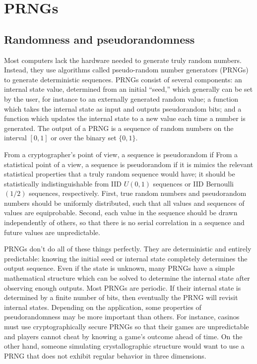 \documentclass[12pt]{article}
\newcommand{\todo}[1]{{\color{red}{TO DO: \sc #1}}}
\begin{document}
\section{PRNGs}
\subsection{Randomness and pseudorandomness}
Most computers lack the hardware needed to generate truly random numbers. 
Instead, they use algorithms called pseudo-random number generators (PRNGs) to generate
deterministic sequences.
PRNGs consist of several components:
an internal state value, determined from an initial ``seed,'' which generally can be set by the user,
for instance to an externally generated random value;
a function which takes the internal state as input and outputs pseudorandom bits;
and a function which updates the internal state to a new value each time a number is generated.
The output of a PRNG is a sequence of random numbers on the interval $[0, 1]$ or over the binary set $\{0, 1\}$.

From a cryptographer's point of view, a sequence is pseudorandom if \todo{define and cite!}
From a statistical point of a view,
a sequence is pseudorandom if it is mimics the relevant statistical properties that a truly random sequence would have;
it should be statistically indistinguishable from IID $U(0,1)$ sequences or IID Bernoulli$(1/2)$ sequences, respectively.
First, true random numbers and pseudorandom numbers should be uniformly distributed, such that all values and sequences of values are equiprobable.
Second, each value in the sequence should be drawn independently of others, so that there is no serial correlation in a sequence and future values are unpredictable.

PRNGs don't do all of these things perfectly.
They are deterministic and entirely predictable: knowing the initial seed or internal state completely determines the output sequence.
Even if the state is unknown, many PRNGs have a simple mathematical structure which can be solved to determine the internal state after observing enough outputs.
Most PRNGs are periodic.
If their internal state is determined by a finite number of bits, then eventually the PRNG will revisit internal states.
Depending on the application, some properties of pseudorandomness may be more important than others.
For instance, casinos must use cryptographically secure PRNGs so that their games are unpredictable and players cannot cheat by knowing a game's outcome ahead of time.
On the other hand, someone simulating crystallographic structure would want to use a PRNG that does not exhibit regular behavior in three dimensions.
\end{document}
